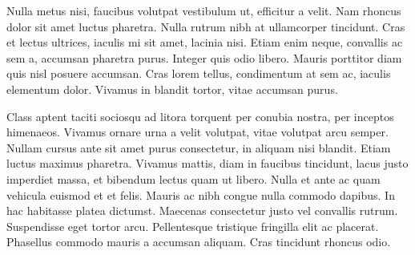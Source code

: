 Nulla metus nisi, faucibus volutpat vestibulum ut, efficitur a velit. Nam rhoncus dolor sit amet luctus pharetra. Nulla rutrum nibh at ullamcorper tincidunt. Cras et lectus ultrices, iaculis mi sit amet, lacinia nisi. Etiam enim neque, convallis ac sem a, accumsan pharetra purus. Integer quis odio libero. Mauris porttitor diam quis nisl posuere accumsan. Cras lorem tellus, condimentum at sem ac, iaculis elementum dolor. Vivamus in blandit tortor, vitae accumsan purus.

Class aptent taciti sociosqu ad litora torquent per conubia nostra, per inceptos himenaeos. Vivamus ornare urna a velit volutpat, vitae volutpat arcu semper. Nullam cursus ante sit amet purus consectetur, in aliquam nisi blandit. Etiam luctus maximus pharetra. Vivamus mattis, diam in faucibus tincidunt, lacus justo imperdiet massa, et bibendum lectus quam ut libero. Nulla et ante ac quam vehicula euismod et et felis. Mauris ac nibh congue nulla commodo dapibus. In hac habitasse platea dictumst. Maecenas consectetur justo vel convallis rutrum. Suspendisse eget tortor arcu. Pellentesque tristique fringilla elit ac placerat. Phasellus commodo mauris a accumsan aliquam. Cras tincidunt rhoncus odio. 
